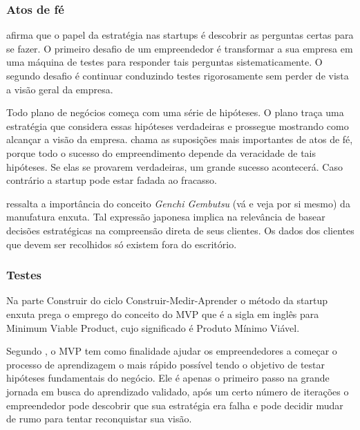 \subsubsection{Atos de fé}
\label{cha:atos_de_fe}

 afirma que o papel da estratégia nas startups é descobrir as perguntas certas para se fazer. O primeiro desafio de um empreendedor é transformar a sua empresa em uma máquina de testes para responder tais perguntas sistematicamente. O segundo desafio é continuar conduzindo testes rigorosamente sem perder de vista a visão geral da empresa.

Todo plano de negócios começa com uma série de hipóteses. O plano traça uma estratégia que considera essas hipóteses verdadeiras e prossegue mostrando como alcançar a visão da empresa.  chama as suposições mais importantes de atos de fé, porque todo o sucesso do empreendimento depende da veracidade de tais hipóteses. Se elas se provarem verdadeiras, um grande sucesso acontecerá. Caso contrário a startup pode estar fadada ao fracasso.

 ressalta a importância do conceito \textit {Genchi Gembutsu} (vá e veja por si mesmo) da manufatura enxuta. Tal expressão japonesa implica na relevância de basear decisões estratégicas na compreensão direta de seus clientes. Os dados dos clientes que devem ser recolhidos só existem fora do escritório.

\subsubsection{Testes}
\label{cha:testes}

Na parte Construir do ciclo Construir-Medir-Aprender o método da startup enxuta prega o emprego do conceito do MVP que é a sigla em inglês para Minimum Viable Product, cujo significado é Produto Mínimo Viável.

Segundo , o MVP tem como finalidade ajudar os empreendedores a começar o processo de aprendizagem o mais rápido possível tendo o objetivo de testar hipóteses fundamentais do negócio. Ele é apenas o primeiro passo na grande jornada em busca do aprendizado validado, após um certo número de iterações o empreendedor pode descobrir que sua estratégia era falha e pode decidir mudar de rumo para tentar reconquistar sua visão.

